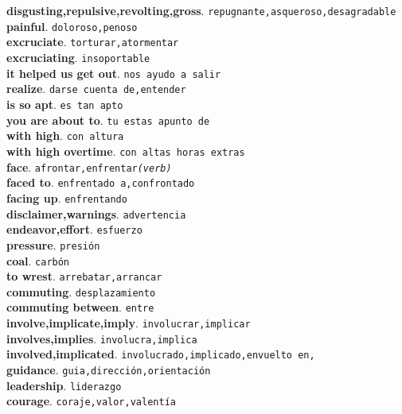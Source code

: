 \documentclass[twocolumn]{article}
\begin{document}
	\textsf{\textbf{disgusting,repulsive,revolting,gross}}. \texttt{repugnante,asqueroso,desagradable}\\
	\textsf{\textbf{painful}}. \texttt{doloroso,penoso}\\
	\textsf{\textbf{excruciate}}. \texttt{torturar,atormentar}\\
	\textsf{\textbf{excruciating}}. \texttt{insoportable}\\
	\textsf{\textbf{it helped us get out}}. \texttt{nos ayudo a salir}\\
	\textsf{\textbf{realize}}. \texttt{darse cuenta de,entender}\\
	\textsf{\textbf{is so apt}}. \texttt{es tan apto}\\
	\textsf{\textbf{you are about to}}. \texttt{tu estas apunto de}\\
	\textsf{\textbf{with high}}. \texttt{con altura}\\
	\textsf{\textbf{with high overtime}}. \texttt{con altas horas extras}\\
	\textsf{\textbf{face}}. \texttt{afrontar,enfrentar{\scriptsize \textsl{(verb)}}}\\
	\textsf{\textbf{faced to}}. \texttt{enfrentado a,confrontado}\\
	\textsf{\textbf{facing up}}. \texttt{enfrentando}\\
	\textsf{\textbf{disclaimer,warnings}}. \texttt{advertencia}\\
	\textsf{\textbf{endeavor,effort}}. \texttt{esfuerzo}\\
	\textsf{\textbf{pressure}}. \texttt{presi\'on}\\
	\textsf{\textbf{coal}}. \texttt{carb\'on}\\
	\textsf{\textbf{to wrest}}. \texttt{arrebatar,arrancar}\\
	\textsf{\textbf{commuting}}. \texttt{desplazamiento}\\
	\textsf{\textbf{commuting between}}. \texttt{entre}\\
	\textsf{\textbf{involve,implicate,imply}}. \texttt{involucrar,implicar}\\
	\textsf{\textbf{involves,implies}}. \texttt{involucra,implica}\\
	\textsf{\textbf{involved,implicated}}. \texttt{involucrado,implicado,envuelto en,}\\
	\textsf{\textbf{guidance}}. \texttt{guia,direcci\'on,orientaci\'on}\\
	\textsf{\textbf{leadership}}. \texttt{liderazgo}\\
	\textsf{\textbf{courage}}. \texttt{coraje,valor,valent\'ia}\\
\end{document}
